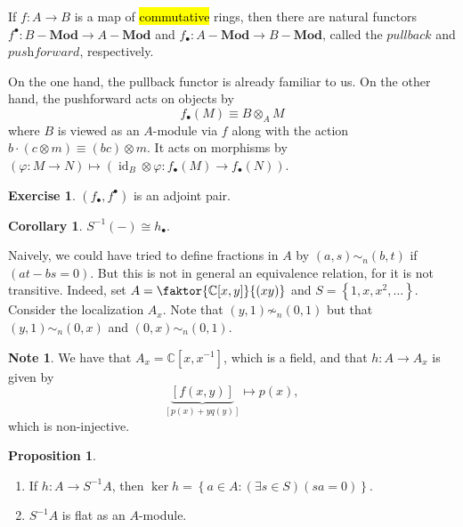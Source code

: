 \documentclass[10pt,letterpaper,cm]{nupset}
\theoremstyle{definition}
\newtheorem{note}[definition]{Note}
\theoremstyle{theorem}
\newtheorem{prop}[definition]{Proposition}
\newtheorem{corollary}[definition]{Corollary}
\newtheorem{exercise}[definition]{Exercise}
\theoremstyle{remark}
\newcommand{\C}{\mathbb C}
\newcommand{\1}{\mathbf{1}}
\newcommand{\0}{\vec 0}
\DeclareMathOperator{\id}{id}
\begin{document}
If $f: A \to B$ is a map of \hl{commutative} rings, then there are natural functors $f^{\bullet}: B{-}\mathbf{Mod} \to A{-}\mathbf{Mod}$ and $f_{\bullet} : A{-} \mathbf{Mod} \to B{-} \mathbf{Mod}$, called the $\textit{pullback}$ and $\textit{pushforward}$, respectively. 

On the one hand, the pullback functor is already familiar to us. On the other hand, the pushforward acts on objects by $$f_{\bullet}(M) \equiv B \otimes_A M$$ where $B$ is viewed as an $A$-module via $f$ along with the action $b\cdot(c \otimes m) \equiv  (bc) \otimes m$. It acts on morphisms by $\left(\varphi : M \to N\right) \mapsto \left(\id_B \otimes \varphi : f_{\bullet}(M) \to f_{\bullet}(N)\right)$. 


\begin{exercise}
$\left(f_{\bullet}, f^{\bullet}\right)$ is an adjoint pair.
\end{exercise}
\begin{corollary}
$S^{-1}(-) \cong h_{\bullet}$.
\end{corollary}

\smallskip

Naively, we could have tried to define fractions in $A$ by  $\left(a,s\right) \sim_n \left(b,t\right)$ if $\left(at-bs =0\right)$. But this is not in general an equivalence relation, for it is not transitive. Indeed, set $A = \faktor{\C[x,y]}{(xy)}$ and $S = \left\{1, x, x^2, \ldots\right\}$. Consider the localization $A_x$. Note that $\left(y,1\right) \not \sim_n \left(0,1\right)$ but that $\left(y,1\right) \sim_n \left(0,x\right)$ and $\left(0,x\right) \sim_n \left(0,1\right)$.

\begin{note}
We have that $A_x = \C[x,x^{-1}]$, which is a field, and that $h: A \to A_x$ is given by $$\underbrace{\left[f(x,y)\right]}_{\left[p(x) +yq(y)\right]} \mapsto p(x),$$ which is non-injective.
\end{note}

\begin{prop} $ $
\begin{enumerate}
\item If $h: A \to S^{-1}A$, then $\ker{h} = \left\{a\in A : \left(\exists s\in S\right)\left(sa = 0\right)\right\}$.
\item $S^{-1}A$ is flat as an $A$-module.
\end{enumerate}
\end{prop}
\end{document}
